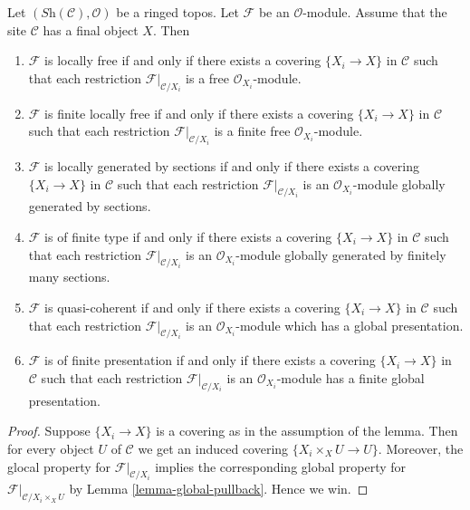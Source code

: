 \begin{lemma}
\label{lemma-local-final-object}
Let $(\textit{Sh}(\mathcal{C}), \mathcal{O})$
be a ringed topos. Let $\mathcal{F}$ be an $\mathcal{O}$-module.
Assume that the site $\mathcal{C}$ has a final object $X$.
Then
\begin{enumerate}
\item $\mathcal{F}$ is locally free if and only if
there exists a covering $\{X_i \to X\}$ in $\mathcal{C}$
such that each restriction $\mathcal{F}|_{\mathcal{C}/X_i}$
is a free $\mathcal{O}_{X_i}$-module.
\item $\mathcal{F}$ is finite locally free if and only if
there exists a covering $\{X_i \to X\}$ in $\mathcal{C}$
such that each restriction $\mathcal{F}|_{\mathcal{C}/X_i}$
is a finite free $\mathcal{O}_{X_i}$-module.
\item $\mathcal{F}$ is locally generated by sections if and only if
there exists a covering $\{X_i \to X\}$ in $\mathcal{C}$
such that each restriction $\mathcal{F}|_{\mathcal{C}/X_i}$
is an $\mathcal{O}_{X_i}$-module globally generated by sections.
\item $\mathcal{F}$ is of finite type if and only if
there exists a covering $\{X_i \to X\}$ in $\mathcal{C}$
such that each restriction $\mathcal{F}|_{\mathcal{C}/X_i}$
is an $\mathcal{O}_{X_i}$-module globally generated by finitely many sections.
\item $\mathcal{F}$ is quasi-coherent if and only if
there exists a covering $\{X_i \to X\}$ in $\mathcal{C}$
such that each restriction $\mathcal{F}|_{\mathcal{C}/X_i}$
is an $\mathcal{O}_{X_i}$-module which has a global presentation.
\item $\mathcal{F}$ is of finite presentation if and only if
there exists a covering $\{X_i \to X\}$ in $\mathcal{C}$
such that each restriction $\mathcal{F}|_{\mathcal{C}/X_i}$
is an $\mathcal{O}_{X_i}$-module has a finite global presentation.
\end{enumerate}
\end{lemma}

\begin{proof}
Suppose $\{X_i \to X\}$ is a covering as in the assumption
of the lemma. Then for every object $U$ of $\mathcal{C}$ we get an
induced covering $\{X_i \times_X U \to U\}$. Moreover, the glocal
property for $\mathcal{F}|_{\mathcal{C}/X_i}$ implies the corresponding
global property for $\mathcal{F}|_{\mathcal{C}/X_i \times_X U}$ by
Lemma \ref{lemma-global-pullback}. Hence we win.
\end{proof}

